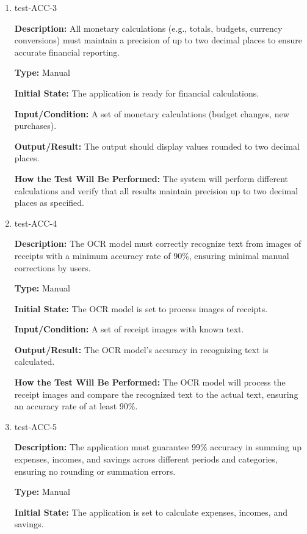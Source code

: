 \documentclass[12pt, titlepage]{article}
\begin{document}
\begin{enumerate}
\item{test-ACC-3\\}

\textbf{Description:} All monetary calculations (e.g., totals, budgets, currency conversions) must maintain a precision of up to two decimal places to ensure accurate financial reporting.

\textbf{Type:} Manual
					
\textbf{Initial State:} The application is ready for financial calculations.
					
\textbf{Input/Condition:} A set of monetary calculations (budget changes, new purchases).
					
\textbf{Output/Result:} The output should display values rounded to two decimal places.
					
\textbf{How the Test Will Be Performed:} The system will perform different calculations and verify that all results maintain precision up to two decimal places as specified.

\item{test-ACC-4\\}

\textbf{Description:} The OCR model must correctly recognize text from images of receipts with a minimum accuracy rate of 90\%, ensuring minimal manual corrections by users.

\textbf{Type:} Manual
					
\textbf{Initial State:} The OCR model is set to process images of receipts.
					
\textbf{Input/Condition:} A set of receipt images with known text.
					
\textbf{Output/Result:} The OCR model's accuracy in recognizing text is calculated.
					
\textbf{How the Test Will Be Performed:} The OCR model will process the receipt images and compare the recognized text to the actual text, ensuring an accuracy rate of at least 90\%.

\item{test-ACC-5\\}

\textbf{Description:} The application must guarantee 99\% accuracy in summing up expenses, incomes, and savings across different periods and categories, ensuring no rounding or summation errors.

\textbf{Type:} Manual
					
\textbf{Initial State:} The application is set to calculate expenses, incomes, and savings.
					

\end{enumerate}
\end{document}
